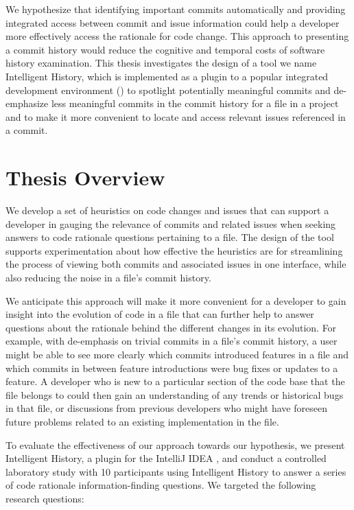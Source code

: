 We hypothesize that identifying important commits automatically and providing integrated access between commit 
and issue information could help a developer more effectively access the rationale for code change.
This approach to presenting a commit history would reduce the cognitive and temporal costs of software history examination. 
This thesis investigates the design of a tool we name Intelligent History, 
which is implemented as a plugin to a popular integrated development environment () 
to spotlight potentially meaningful commits and de-emphasize 
less meaningful commits in the commit history for a file in a project and to make it more convenient 
to locate and access relevant issues referenced in a commit. 


\section{Thesis Overview}

We develop a set of heuristics on code changes and issues that can support a developer 
in gauging the relevance of commits and related issues when seeking answers 
to code rationale questions pertaining to a file.
The design of the tool supports experimentation about how effective the heuristics are 
for streamlining the process of viewing both commits and associated issues in one interface, 
while also reducing the noise in a file's commit history.

We anticipate this approach will make it more convenient for a developer to gain insight into the evolution of code in a file that can further help to answer questions about the rationale behind the different changes in its evolution. 
For example, with de-emphasis on trivial commits in a file's commit history, a user might be able to see more clearly which commits introduced features in a file and which commits in between feature introductions were bug fixes or updates to a feature.
A developer who is new to a particular section of the code base that the file belongs to could then gain an understanding of any trends or historical bugs in that file, 
or discussions from previous developers who might have foreseen future problems related to an existing implementation in the file.

To evaluate the effectiveness of our approach towards our hypothesis, 
we present Intelligent History, a plugin for the IntelliJ IDEA ,
and conduct a controlled laboratory study with 10 participants using Intelligent History to answer a series of code rationale information-finding questions.
We targeted the following research questions:

